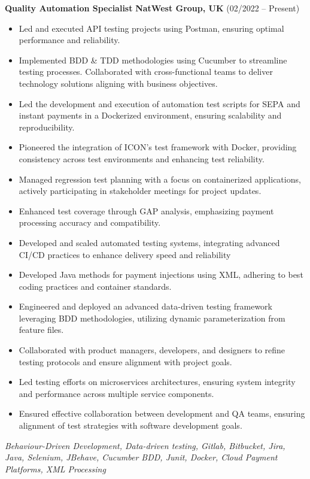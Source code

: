 \documentclass[11pt,a4paper]{article}
\begin{document}
    \noindent \textbf{Quality Automation Specialist} \hfill \textbf{NatWest Group, UK}  (02/2022 – Present) \\
    \begin{itemize}
        \item Led and executed API testing projects using Postman, ensuring optimal performance and reliability.
        \item Implemented BDD & TDD methodologies using Cucumber to streamline testing processes. Collaborated with cross-functional teams to deliver technology solutions aligning with business objectives.
        \item Led the development and execution of automation test scripts for SEPA and instant payments in a Dockerized environment, ensuring scalability and reproducibility.
        \item Pioneered the integration of ICON's test framework with Docker, providing consistency across test environments and enhancing test reliability.
        \item Managed regression test planning with a focus on containerized applications, actively participating in stakeholder meetings for project updates.
        \item Enhanced test coverage through GAP analysis, emphasizing payment processing accuracy and compatibility.
        \item Developed and scaled automated testing systems, integrating advanced CI/CD practices to enhance delivery speed and reliability
        \item Developed Java methods for payment injections using XML, adhering to best coding practices and container standards.
        \item Engineered and deployed an advanced data-driven testing framework leveraging BDD methodologies, utilizing dynamic parameterization from feature files.
        \item Collaborated with product managers, developers, and designers to refine testing protocols and ensure alignment with project goals.
        \item Led testing efforts on microservices architectures, ensuring system integrity and performance across multiple service components.
        \item Ensured effective collaboration between development and QA teams, ensuring alignment of test strategies with software development goals.
    \end{itemize}
    \small \textit{Behaviour-Driven Development, Data-driven testing, Gitlab, Bitbucket, Jira, Java, Selenium, JBehave, Cucumber BDD, Junit, Docker, Cloud Payment Platforms, XML Processing}
\end{document}
